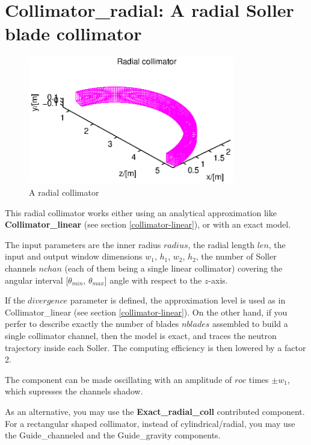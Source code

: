 \section{Collimator\_radial: A radial Soller blade collimator}


\begin{figure}
  \begin{center}
    \includegraphics[width=0.8\textwidth]{figures/radial.eps}
  \end{center}
\caption{A radial collimator}
\label{f:coll-radial}
\end{figure}

This radial collimator works either using an analytical approximation
like {\bf Collimator\_linear} (see section \ref{collimator-linear}),
or with an exact model.

The input parameters are the inner radius $radius$, the radial length $len$,
the input and output window dimensions $w_1$, $h_1$, $w_2$, $h_2$,
the number of Soller channels $nchan$
(each of them being a single linear collimator) covering the angular interval
[$\theta_{min}$, $\theta_{max}$] angle with respect to the $z$-axis.

If the $divergence$ parameter is defined,
the approximation level is used as in {\rm Collimator\_linear}
(see section \ref{collimator-linear}).
On the other hand, if you perfer to describe exactly the number of blades
$nblades$ assembled to build a single collimator channel,
then the model is exact, and traces the neutron trajectory inside each Soller.
The computing efficiency is then lowered by a factor 2.

The component can be made oscillating with an amplitude of $roc$ times
$\pm w_1$, which supresses the channels shadow.

As an alternative, you may use the {\bf Exact\_radial\_coll} contributed component.
For a rectangular shaped collimator, instead of cylindrical/radial, you may use the Guide\_channeled and the Guide\_gravity components.
